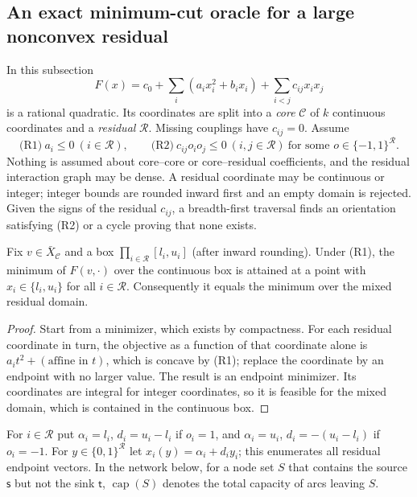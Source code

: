 \subsection{An exact minimum-cut oracle for a large nonconvex residual}\label{sec:cr-cut}

In this subsection
\[
F(x)=c_0+\sum_i(a_ix_i^2+b_ix_i)+\sum_{i<j}c_{ij}x_ix_j
\]
is a rational quadratic. Its coordinates are split into a \emph{core}
$\mathcal C$ of $k$ continuous coordinates and a \emph{residual}
$\mathcal R$. Missing couplings have $c_{ij}=0$. Assume
\begin{equation}\label{eq:cr-class}
\text{(R1)}\ a_i\le0\ (i\in\mathcal R),\qquad
\text{(R2)}\ c_{ij}o_io_j\le0\ (i,j\in\mathcal R)\ \text{for some }
o\in\{-1,1\}^{\mathcal R}.
\end{equation}
Nothing is assumed about core--core or core--residual coefficients, and
the residual interaction graph may be dense. A residual coordinate may be
continuous or integer; integer bounds are rounded inward first and an
empty domain is rejected. Given the signs of the residual $c_{ij}$, a
breadth-first traversal finds an orientation satisfying (R2) or a cycle
proving that none exists.

\begin{lemma}\label{lem:cr-endpoint}
Fix $v\in\bar X_{\mathcal C}$ and a box $\prod_{i\in\mathcal R}[l_i,u_i]$
(after inward rounding). Under (R1), the minimum of $F(v,\cdot)$ over the
continuous box is attained at a point with $x_i\in\{l_i,u_i\}$ for all
$i\in\mathcal R$. Consequently it equals the minimum over the mixed
residual domain.
\end{lemma}
\begin{proof}
Start from a minimizer, which exists by compactness. For each residual
coordinate in turn, the objective as a function of that coordinate alone
is $a_it^2+(\text{affine in }t)$, which is concave by (R1); replace the
coordinate by an endpoint with no larger value. The result is an endpoint
minimizer. Its coordinates are integral for integer coordinates, so it is
feasible for the mixed domain, which is contained in the continuous box.
\end{proof}

For $i\in\mathcal R$ put $\alpha_i=l_i$, $d_i=u_i-l_i$ if $o_i=1$, and
$\alpha_i=u_i$, $d_i=-(u_i-l_i)$ if $o_i=-1$. For $y\in\{0,1\}^{\mathcal R}$
let $x_i(y)=\alpha_i+d_iy_i$; this enumerates all residual endpoint
vectors. In the network below, for a node set $S$ that contains the
source $\mathsf s$ but not the sink $\mathsf t$, $\operatorname{cap}(S)$
denotes the total capacity of arcs leaving $S$.

